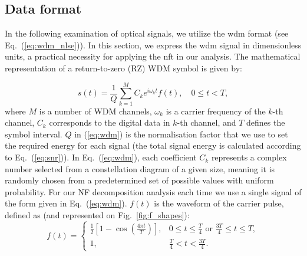 \subsection{Data format}


In the following examination of optical signals, we utilize the \gls{wdm} format (see Eq.~(\ref{eq:wdm_nlse})). In this section, we express the \gls{wdm} signal in dimensionless units, a practical necessity for applying the \Gls{nft} in our analysis. The mathematical representation of a return-to-zero (RZ) WDM symbol is given by:

\begin{equation}
s(t) = \frac{1}{Q} \sum_{k=1}^{M} C_k e^{i \omega_k t} f(t), \quad 0 \leq t < T,
\label{eq:wdm}
\end{equation}
where $M$ is a number of WDM channels, $\omega_k$ is a carrier frequency of the $k$-th channel, $C_k$ corresponds to the digital data in $k$-th channel, and $T$ defines the symbol interval.
$Q$ in (\ref{eq:wdm}) is the normalisation factor that we use to set the required energy for each signal (the total signal energy is calculated according to Eq.~(\ref{eq:snr})).
In Eq.~(\ref{eq:wdm}), each coefficient \( C_k \) represents a complex number selected from a constellation diagram of a given size, meaning it is randomly chosen from a predetermined set of possible values with uniform probability.
For our NF decomposition analysis each time we use a single signal of the form given in Eq.~(\ref{eq:wdm}). 
\( f(t) \) is the waveform of the carrier pulse, defined as (and represented on Fig.~\ref{fig:f_shapes}):
\begin{equation}
f(t) = 
\begin{cases} 
\frac{1}{2} \left[ 1 - \cos \left( \frac{4\pi t}{T} \right) \right], & 0 \leq t \leq \frac{T}{4} \text{ or } \frac{3T}{4} \leq t \leq T, \\
1, & \frac{T}{4} < t < \frac{3T}{4}.
\end{cases}
\label{eq:wdm_envelope}
\end{equation}


